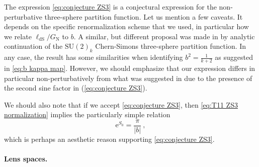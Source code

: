 \documentclass[12pt,a4paper]{article}
\newcommand{\be}{\begin{equation}}
\newcommand{\ee}{\end{equation}}
\newcommand\SU{\text{SU}}
\begin{document}
The expression \eqref{eq:conjecture ZS3} is a conjectural expression for the non-perturbative three-sphere partition function. Let us mention a few caveats. It depends on the specific renormalization scheme that we used, in particular how we relate $\ell_\text{dS}/G_\text{N}$ to $b$. A similar, but different proposal was made in \cite{Anninos:2020hfj} by analytic continuation of the $\SU(2)_k$ Chern-Simons three-sphere partition function. 
In any case, the result has some similarities when identifying $b^2=\frac{1}{k+2}$ as suggested in \eqref{eq:b kappa map}. However, we should emphasize that our expression differs in particular non-perturbatively from what was suggested in \cite{Anninos:2020hfj} due to the presence of the second sine factor in (\ref{eq:conjecture ZS3}). 

We should also note that if we accept \eqref{eq:conjecture ZS3}, then \eqref{eq:T11 ZS3 normalization} implies the particularly simple relation
\be 
\mathrm{e}^{S_0} =\frac{\pi}{|b|}~ ,
\ee
which is perhaps an aesthetic reason supporting \eqref{eq:conjecture ZS3}.

\paragraph{Lens spaces.}
\end{document}
